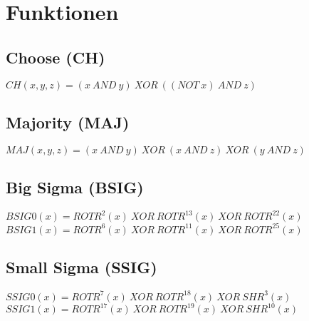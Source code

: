 \section{Funktionen}


\subsection{Choose (CH)}
$ CH( x, y, z) = (x~AND~y)~XOR~( (NOT~x)~AND~z) $

\subsection{Majority (MAJ)}
$ MAJ( x, y, z) = (x~AND~y)~XOR~(x~AND~z)~XOR~(y~AND~z) $

\subsection{Big Sigma (BSIG)}
$ BSIG0(x) = ROTR^{2}(x)~XOR~ROTR^{13}(x)~XOR~ROTR^{22}(x) $\\
$ BSIG1(x) = ROTR^{6}(x)~XOR~ROTR^{11}(x)~XOR~ROTR^{25}(x) $

\subsection{Small Sigma (SSIG)}
$ SSIG0(x) = ROTR^{7}(x)~XOR~ROTR^{18}(x)~XOR~SHR^{3}(x) $\\
$ SSIG1(x) = ROTR^{17}(x)~XOR~ROTR^{19}(x)~XOR~SHR^{10}(x) $